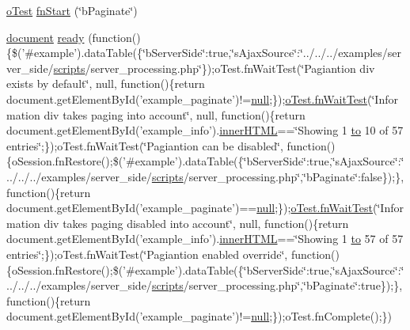 \begin{DoxyCompactItemize}
\item 
\hyperlink{unit__test_8js_a3b2d259e2df3b6860d9047a92d09d0d6}{o\+Test} \hyperlink{4__server-side_2b_paginate_8js_a28d8677b23b9e2034cf6b725dd63f79a}{fn\+Start} (\char`\"{}b\+Paginate\char`\"{})
\item 
\hyperlink{outside_events_8js_aa14f8e0338cced6720590fd2ea13bd4b}{document} \hyperlink{4__server-side_2b_paginate_8js_ab91978a88a58ffac5f5548d5db00ebc4}{ready} (function()\{\$('\#example').data\+Table(\{\char`\"{}b\+Server\+Side\char`\"{}\+:true,\char`\"{}s\+Ajax\+Source\char`\"{}\+:\char`\"{}../../../examples/server\+\_\+side/\hyperlink{tinymce_8jquery_8dev_8js_a09066d4d580eeec222f858d588b4cdef}{scripts}/server\+\_\+processing.\+php\char`\"{}\});o\+Test.\+fn\+Wait\+Test(\char`\"{}Pagiantion div exists by default\char`\"{}, null, function()\{return document.\+get\+Element\+By\+Id('example\+\_\+paginate')!=\hyperlink{validate_8js_afb8e110345c45e74478894341ab6b28e}{null};\});\hyperlink{onhold_24__server-side_2__zero__config_8js_ab25c4d596771c0133cdc45178ce72c3d}{o\+Test.\+fn\+Wait\+Test}(\char`\"{}Information div takes paging into account\char`\"{}, null, function()\{return document.\+get\+Element\+By\+Id('example\+\_\+info').\hyperlink{jquery-ui_8js_a87f73c4f0391c1cf9fe60374a76d9a7b}{inner\+H\+T\+M\+L}==\char`\"{}Showing 1 \hyperlink{jquery-ui_8js_af6086621f45baa2cf538f19e45d3c263}{to} 10 of 57 entries\char`\"{};\});o\+Test.\+fn\+Wait\+Test(\char`\"{}Pagiantion can be disabled\char`\"{}, function()\{o\+Session.\+fn\+Restore();\$('\#example').data\+Table(\{\char`\"{}b\+Server\+Side\char`\"{}\+:true,\char`\"{}s\+Ajax\+Source\char`\"{}\+:\char`\"{}../../../examples/server\+\_\+side/\hyperlink{tinymce_8jquery_8dev_8js_a09066d4d580eeec222f858d588b4cdef}{scripts}/server\+\_\+processing.\+php\char`\"{},\char`\"{}b\+Paginate\char`\"{}\+:false\});\}, function()\{return document.\+get\+Element\+By\+Id('example\+\_\+paginate')==\hyperlink{validate_8js_afb8e110345c45e74478894341ab6b28e}{null};\});\hyperlink{onhold_24__server-side_2__zero__config_8js_ab25c4d596771c0133cdc45178ce72c3d}{o\+Test.\+fn\+Wait\+Test}(\char`\"{}Information div takes paging disabled into account\char`\"{}, null, function()\{return document.\+get\+Element\+By\+Id('example\+\_\+info').\hyperlink{jquery-ui_8js_a87f73c4f0391c1cf9fe60374a76d9a7b}{inner\+H\+T\+M\+L}==\char`\"{}Showing 1 \hyperlink{jquery-ui_8js_af6086621f45baa2cf538f19e45d3c263}{to} 57 of 57 entries\char`\"{};\});o\+Test.\+fn\+Wait\+Test(\char`\"{}Pagiantion enabled override\char`\"{}, function()\{o\+Session.\+fn\+Restore();\$('\#example').data\+Table(\{\char`\"{}b\+Server\+Side\char`\"{}\+:true,\char`\"{}s\+Ajax\+Source\char`\"{}\+:\char`\"{}../../../examples/server\+\_\+side/\hyperlink{tinymce_8jquery_8dev_8js_a09066d4d580eeec222f858d588b4cdef}{scripts}/server\+\_\+processing.\+php\char`\"{},\char`\"{}b\+Paginate\char`\"{}\+:true\});\}, function()\{return document.\+get\+Element\+By\+Id('example\+\_\+paginate')!=\hyperlink{validate_8js_afb8e110345c45e74478894341ab6b28e}{null};\});o\+Test.\+fn\+Complete();\})
\end{DoxyCompactItemize}


